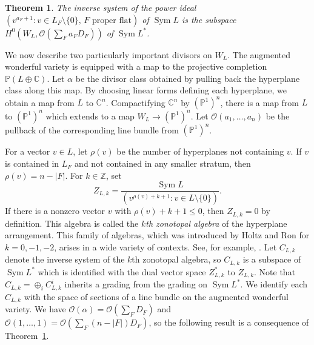 \documentclass{amsart}
\newtheorem{theorem}{Theorem}[section]
\theoremstyle{definition}
\begin{document}
\begin{theorem}\label{thm:powerideal}
The inverse system of the power ideal $(v^{a_F + 1} : v \in L_F \setminus \{0\},\, F \text{ proper flat})$ of $\operatorname{Sym} L$ is the subspace $H^0(W_L, \mathcal{O}(\sum_F a_F D_F))$ of $\operatorname{Sym} L^*$. 
\end{theorem}

We now describe two particularly important divisors on $W_L$. 
The augmented wonderful variety is equipped with a map to the projective completion $\mathbb{P}(L \oplus \mathbb{C})$. Let $\alpha$ be the divisor class obtained by pulling back the hyperplane class along this map. By choosing linear forms defining each hyperplane, we obtain a map from $L$ to $\mathbb{C}^n$. Compactifying $\mathbb{C}^n$ by $(\mathbb{P}^1)^n$, there is a map from $L$ to $(\mathbb{P}^1)^n$ which extends to a map $W_L \to (\mathbb{P}^1)^n$. Let $\mathcal{O}(a_1, \dotsc, a_n)$ be the pullback of the corresponding line bundle from $(\mathbb{P}^1)^n$. 
\begin{center}
\end{center}

 For a vector $v \in L$, let $\rho(v)$ be the number of hyperplanes not containing $v$. If $v$ is contained in $L_F$ and not contained in any smaller stratum, then $\rho(v) = n - |F|$. 
 For $k \in \mathbb{Z}$, set 
$$Z_{L, k} = \frac{\operatorname{Sym} L}{(v^{\rho(v) + k + 1} : v \in L \setminus \{0\})}.$$
If there is a nonzero vector $v$ with $\rho(v) + k + 1 \le 0$, then 
$Z_{L, k} = 0$ by definition. This algebra is called the \emph{$k$th 
zonotopal algebra} of the hyperplane arrangement. This family of 
algebras, which was introduced by Holtz and Ron \cite{HoltzRon} for $k = 
0,-1,-2$, arises 
in a wide variety of contexts. See, for example, 
\cites{DM,PSS,SturmfelsXu, 
ArdilaPostnikov,BergetTutte,Lenz,RRT,GeoZonotopeI,GeoZonotopeII}. 
Let $C_{L, k}$ denote the inverse system of the $k$th zonotopal algebra, so $C_{L,k}$ is a subspace of $\operatorname{Sym} L^*$ which is identified with the dual vector space $Z_{L,k}^*$ to $Z_{L,k}$. Note that $C_{L,k} = \oplus_i C_{L,k}^i$ inherits a grading from the grading on $\operatorname{Sym} L^*$. 
We identify each $C_{L,k}$ with the space of sections of a line bundle on the augmented wonderful variety. We have $\mathcal{O}(\alpha) = \mathcal{O}(\sum_F D_F)$ and $\mathcal{O}(1, \dotsc, 1) = \mathcal{O}(\sum_F (n - |F|) D_F)$, so the following result is a consequence of Theorem~\ref{thm:powerideal}.
\end{document}
